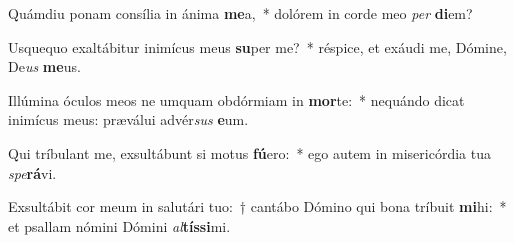 \item Quámdiu ponam consília in ánima \textbf{me}a,~* dolórem in corde meo \textit{per} \textbf{di}em?
\item Usquequo exaltábitur inimícus meus \textbf{su}per me?~* réspice, et exáudi me, Dómine, De\textit{us} \textbf{me}us.
\item Illúmina óculos meos ne umquam obdórmiam in \textbf{mor}te:~* nequándo dicat inimícus meus: præválui advér\textit{sus} \textbf{e}um.
\item Qui tríbulant me, exsultábunt si motus \textbf{fú}ero:~* ego autem in misericórdia tua \textit{spe}\textbf{rá}vi.
\item Exsultábit cor meum in salutári tuo:~† cantábo Dómino qui bona tríbuit \textbf{mi}hi:~* et psallam nómini Dómini \textit{al}\textbf{tís}\textbf{si}mi.
